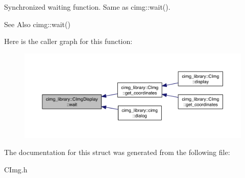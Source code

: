 Synchronized waiting function. Same as cimg\-::wait(). 

\begin{DoxySeeAlso}{See Also}
cimg\-::wait() 
\end{DoxySeeAlso}


Here is the caller graph for this function\-:
\nopagebreak
\begin{figure}[H]
\begin{center}
\leavevmode
\includegraphics[width=350pt]{structcimg__library_1_1_c_img_display_a96efe590da16f2e5b4510b2fde423c67_icgraph}
\end{center}
\end{figure}




The documentation for this struct was generated from the following file\-:\begin{DoxyCompactItemize}
\item 
C\-Img.\-h\end{DoxyCompactItemize}
